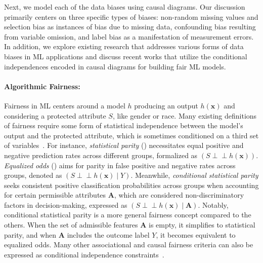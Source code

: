 \documentclass[11pt]{article}
\newcommand{\classifier}{\ensuremath{h}}
\newcommand{\ProtectedAttr}{S}
\newcommand{\Admis}{\boldsymbol{A}}
\newcommand{\indep}{\mbox{$\perp\!\!\!\perp$}}
\begin{document}
Next, we model each of the data biases using causal diagrams. Our discussion primarily centers on three specific types of biases: non-random missing values and selection bias as instances of bias due to missing data, confounding bias resulting from variable omission, and label bias as a manifestation of measurement errors.
In addition, we explore existing research that addresses various forms of data biases in ML applications and discuss recent works that utilize the conditional independences encoded in causal diagrams for building fair ML models. 
\vspace{-.3cm}
\paragraph{Algorithmic Fairness:}
Fairness in  ML centers around a model $\classifier$ producing an output $h(\boldsymbol{x})$ and considering a protected attribute $\ProtectedAttr$, like gender or race. Many existing definitions of fairness require some form of statistical independence between the model's output and the protected attribute, which is sometimes conditioned on a third set of variables~\cite{mehrabi2021survey}. For instance, \textit{statistical parity} (\cite{dwork2012fairness}) necessitates equal positive and negative prediction rates across different groups, formalized as $(\ProtectedAttr \indep h(\boldsymbol{x}))$. \textit{Equalized odds} (\cite{hardt2016equality}) aims for parity in false positive and negative rates across groups, denoted as $\mbox{$(\ProtectedAttr \indep h(\boldsymbol{x}) \mid Y)$}$. 
Meanwhile, \textit{conditional statistical parity} seeks consistent positive classification probabilities across groups when accounting for certain permissible attributes $\Admis$, which are considered non-discriminatory factors in decision-making, expressed as $\mbox{$(\ProtectedAttr \indep h(\boldsymbol{x}) \mid \Admis)$}$. Notably, conditional statistical parity is a more general fairness concept compared to the others. When the set of admissible features $\Admis$ is empty, it simplifies to statistical parity, and when $\Admis$ includes the outcome label $Y$, it becomes equivalent to equalized odds. Many other associational and causal fairness criteria can also be expressed as conditional independence constraints~\cite{salimi2020database}.
\end{document}
